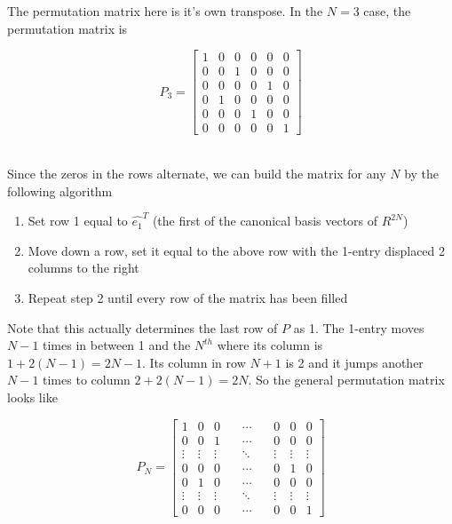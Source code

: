 \documentclass[paper=a4, fontsize=12pt]{scrartcl} %
\numberwithin{equation}{section}       %
\numberwithin{figure}{section}         %
\numberwithin{table}{section}          %
\begin{document}
\noindent The permutation matrix here is it's own transpose. In the $N=3$ case, the permutation matrix is 

$$P_3 = 
\begin{bmatrix}
1 & 0 & 0 & 0 & 0 & 0 \\ 
0 & 0 & 1 & 0 & 0 & 0 \\ 
0 & 0 & 0 & 0 & 1 & 0 \\
0 & 1 & 0 & 0 & 0 & 0 \\ 
0 & 0 & 0 & 1 & 0 & 0 \\ 
0 & 0 & 0 & 0 & 0 & 1 
\end{bmatrix}
$$

\\


\noindent Since the zeros in the rows alternate, we can build the matrix for any $N$ by the following algorithm 

\begin{enumerate}
\item Set row 1 equal to $\widehat{e_1}^T$ (the first of the canonical basis vectors of $R^{2N}$) 
\item Move down a row, set it equal to the above row with the 1-entry displaced 2 columns to the right
\item Repeat step 2 until every row of the matrix has been filled
\end{enumerate}

\noindent Note that this actually determines the last row of $P$ as 1. The 1-entry moves $N-1$ times in between 1 and the $N^{th}$ where its column is $1 + 2(N-1) = 2N-1$. Its column in row $N+1$ is 2 and it jumps another $N-1$ times to column $2 + 2(N-1) = 2N$. So the general permutation matrix looks like 

$$ P_N = 
  \begin{bmatrix}
     1 & 0 & 0  & \, &\cdots & \, & 0 & 0 & 0  \\
     0 & 0 & 1  & \, &\cdots & \, & 0 & 0 & 0 \\
     \vdots & \vdots & \vdots & \, & \ddots & \, & \vdots & \vdots & \vdots \\
     0 & 0 & 0 & \, &\cdots & \, & 0 & 1 & 0 \\ 
	 0 & 1 & 0 & \, &\cdots & \, & 0 & 0 & 0 \\	
     \vdots & \vdots & \vdots & \, & \ddots & \, & \vdots & \vdots & \vdots \\
	 0 & 0 & 0  & \, & \cdots & \, & 0 & 0 & 1   
  \end{bmatrix}
$$
\end{document}

